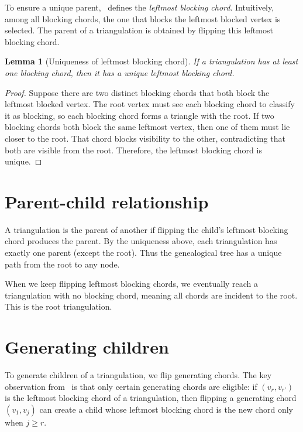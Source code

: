 \documentclass[12pt,a4paper]{report}
\newtheorem{lemma}[theorem]{Lemma}
\theoremstyle{definition}
\theoremstyle{remark}
\begin{document}
To ensure a unique parent,~\cite{parvez2011} defines the \textit{leftmost blocking
chord}. Intuitively, among all blocking chords, the one that blocks the leftmost blocked
vertex is selected. The parent of a triangulation is obtained by flipping this leftmost
blocking chord.

\begin{lemma}[Uniqueness of leftmost blocking chord]
If a triangulation has at least one blocking chord, then it has a unique leftmost blocking
chord.
\end{lemma}

\begin{proof}
Suppose there are two distinct blocking chords that both block the leftmost blocked
vertex. The root vertex must see each blocking chord to classify it as blocking, so each
blocking chord forms a triangle with the root. If two blocking chords both block the same
leftmost vertex, then one of them must lie closer to the root. That chord blocks
visibility to the other, contradicting that both are visible from the root. Therefore,
the leftmost blocking chord is unique.
\end{proof}

\section{Parent-child relationship}

A triangulation is the parent of another if flipping the child's leftmost blocking chord
produces the parent. By the uniqueness above, each triangulation has exactly one parent
(except the root). Thus the genealogical tree has a unique path from the root to any
node.

When we keep flipping leftmost blocking chords, we eventually reach a triangulation with
no blocking chord, meaning all chords are incident to the root. This is the root
triangulation.

\section{Generating children}

To generate children of a triangulation, we flip generating chords. The key observation
from~\cite{parvez2011} is that only certain generating chords are eligible: if
$(v_r,v_{r'})$ is the leftmost blocking chord of a triangulation, then flipping a
generating chord $(v_1,v_j)$ can create a child whose leftmost blocking chord is the new
chord only when $j \ge r$.
\end{document}
